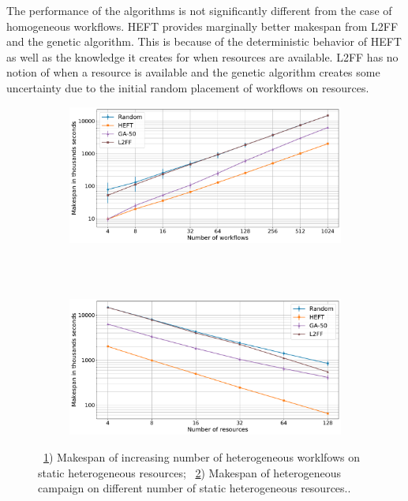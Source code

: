 The performance of the algorithms is not significantly different from the case of homogeneous workflows.
HEFT provides marginally better makespan from L2FF and the genetic algorithm.
This is because of the deterministic behavior of HEFT as well as the knowledge it creates for when resources are available.
L2FF has no notion of when a resource is available and the genetic algorithm creates some uncertainty due to the initial random placement of workflows on resources.


\begin{figure}[ht!]
    \centering
    \begin{subfigure}[b]{0.85\textwidth}
        \includegraphics[width=.95\textwidth]{figures/campaign/StHeteroCampaigns_4StHeteroResources.pdf}
        \caption{}
        \label{fig:StHeteroCampaigns_4StHeteroResources}
    \end{subfigure}\\
    ~ 
    \begin{subfigure}[b]{0.85\textwidth}
        \includegraphics[width=.95\textwidth]{figures/campaign/StHeteroResources_StHeteroCampaigns.pdf}
        \caption{}
        \label{fig:StHeteroResources_StHeteroCampaigns}
    \end{subfigure}
    \caption{~\ref{fig:StHeteroCampaigns_4StHeteroResources}) Makespan of increasing number of heterogeneous worklfows on static heterogeneous resources;
        ~\ref{fig:StHeteroResources_StHeteroCampaigns}) Makespan of heterogeneous campaign on different number of static heterogeneous resources..}
    \label{fig:heter_analysis}
\end{figure}

